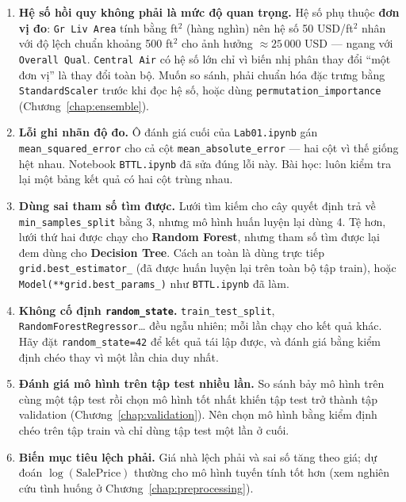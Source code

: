 \begin{enumerate}
    \item \textbf{Hệ số hồi quy không phải là mức độ quan trọng.} Hệ số phụ thuộc \textbf{đơn vị đo}: \texttt{Gr Liv Area} tính bằng ft$^2$ (hàng nghìn) nên hệ số 50 USD/ft$^2$ nhân với độ lệch chuẩn khoảng 500 ft$^2$ cho ảnh hưởng $\approx 25\,000$ USD --- ngang với \texttt{Overall Qual}. \texttt{Central Air} có hệ số lớn chỉ vì biến nhị phân thay đổi ``một đơn vị'' là thay đổi toàn bộ. Muốn so sánh, phải chuẩn hóa đặc trưng bằng \texttt{StandardScaler} trước khi đọc hệ số, hoặc dùng \texttt{permutation\_importance} (Chương~\ref{chap:ensemble}).
    \item \textbf{Lỗi ghi nhãn độ đo.} Ô đánh giá cuối của \texttt{Lab01.ipynb} gán \texttt{mean\_squared\_error} cho cả cột \texttt{mean\_absolute\_error} --- hai cột vì thế giống hệt nhau. Notebook \texttt{BTTL.ipynb} đã sửa đúng lỗi này. Bài học: luôn kiểm tra lại một bảng kết quả có hai cột trùng nhau.
    \item \textbf{Dùng sai tham số tìm được.} Lưới tìm kiếm cho cây quyết định trả về \texttt{min\_\allowbreak samples\_\allowbreak split} bằng 3, nhưng mô hình huấn luyện lại dùng 4. Tệ hơn, lưới thứ hai được chạy cho \textbf{Random Forest}, nhưng tham số tìm được lại đem dùng cho \textbf{Decision Tree}. Cách an toàn là dùng trực tiếp \texttt{grid.\allowbreak best\_estimator\_} (đã được huấn luyện lại trên toàn bộ tập train), hoặc \texttt{Model(**grid.\allowbreak best\_params\_)} như \texttt{BTTL.ipynb} đã làm.
    \item \textbf{Không cố định \texttt{random\_state}.} \texttt{train\_test\_split}, \texttt{RandomForestRegressor}\ldots{} đều ngẫu nhiên; mỗi lần chạy cho kết quả khác. Hãy đặt \texttt{random\_state=42} để kết quả tái lập được, và đánh giá bằng kiểm định chéo thay vì một lần chia duy nhất.
    \item \textbf{Đánh giá mô hình trên tập test nhiều lần.} So sánh bảy mô hình trên cùng một tập test rồi chọn mô hình tốt nhất khiến tập test trở thành tập validation (Chương~\ref{chap:validation}). Nên chọn mô hình bằng kiểm định chéo trên tập train và chỉ dùng tập test một lần ở cuối.
    \item \textbf{Biến mục tiêu lệch phải.} Giá nhà lệch phải và sai số tăng theo giá; dự đoán $\log(\text{SalePrice})$ thường cho mô hình tuyến tính tốt hơn (xem nghiên cứu tình huống ở Chương~\ref{chap:preprocessing}).
\end{enumerate}

